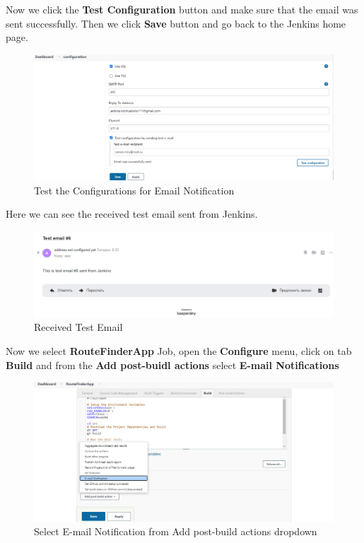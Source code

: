 \documentclass[12pt,a4paper,twoside]{article}
\begin{document}
Now we click the \textbf{Test Configuration} button and make sure that the email was sent successfully. Then we click \textbf{Save} button and go back to the Jenkins home page.


\begin{figure}[H]
    \centering
        \includegraphics[width=15cm]{images-aws/53-email-test-configuration.png}
        \caption{Test the Configurations for Email Notification}
\end{figure}


Here we can see the received test email sent from Jenkins.


\begin{figure}[H]
    \centering
        \includegraphics[width=15cm]{images-aws/54-email-test-confirmation.png}
        \caption{Received Test Email}
\end{figure}


Now we select \textbf{RouteFinderApp} Job, open the \textbf{Configure} menu, click on tab \textbf{Build} and from the \textbf{Add post-buidl actions} select \textbf{E-mail Notifications}


\begin{figure}[H]
    \centering
        \includegraphics[width=15cm]{images-aws/55-email-notification-buil-setting.png}
        \caption{Select E-mail Notification from Add post-build actions dropdown}
\end{figure}
\end{document}
